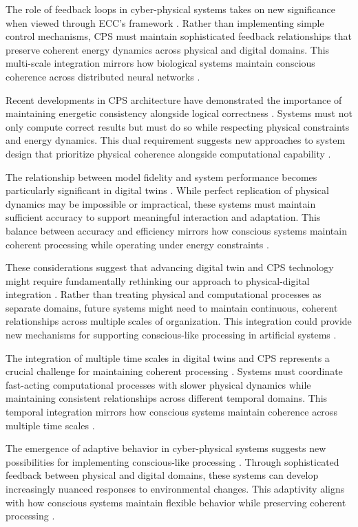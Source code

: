 \begin{refsection}
The role of feedback loops in cyber-physical systems takes on new significance when viewed through ECC's framework \cite{Lee2018}. Rather than implementing simple control mechanisms, CPS must maintain sophisticated feedback relationships that preserve coherent energy dynamics across physical and digital domains. This multi-scale integration mirrors how biological systems maintain conscious coherence across distributed neural networks \cite{Rajkumar2018}.

Recent developments in CPS architecture have demonstrated the importance of maintaining energetic consistency alongside logical correctness \cite{Grieves2021}. Systems must not only compute correct results but must do so while respecting physical constraints and energy dynamics. This dual requirement suggests new approaches to system design that prioritize physical coherence alongside computational capability \cite{Liu2021}.

The relationship between model fidelity and system performance becomes particularly significant in digital twins \cite{Tao2019}. While perfect replication of physical dynamics may be impossible or impractical, these systems must maintain sufficient accuracy to support meaningful interaction and adaptation. This balance between accuracy and efficiency mirrors how conscious systems maintain coherent processing while operating under energy constraints \cite{Uhlemann2017}.

These considerations suggest that advancing digital twin and CPS technology might require fundamentally rethinking our approach to physical-digital integration \cite{Wang2019}. Rather than treating physical and computational processes as separate domains, future systems might need to maintain continuous, coherent relationships across multiple scales of organization. This integration could provide new mechanisms for supporting conscious-like processing in artificial systems \cite{White2021}.

The integration of multiple time scales in digital twins and CPS represents a crucial challenge for maintaining coherent processing \cite{Fuller2020}. Systems must coordinate fast-acting computational processes with slower physical dynamics while maintaining consistent relationships across different temporal domains. This temporal integration mirrors how conscious systems maintain coherence across multiple time scales \cite{Jones2020}.

The emergence of adaptive behavior in cyber-physical systems suggests new possibilities for implementing conscious-like processing \cite{Madni2019}. Through sophisticated feedback between physical and digital domains, these systems can develop increasingly nuanced responses to environmental changes. This adaptivity aligns with how conscious systems maintain flexible behavior while preserving coherent processing \cite{Minerva2020}.


\end{refsection}
